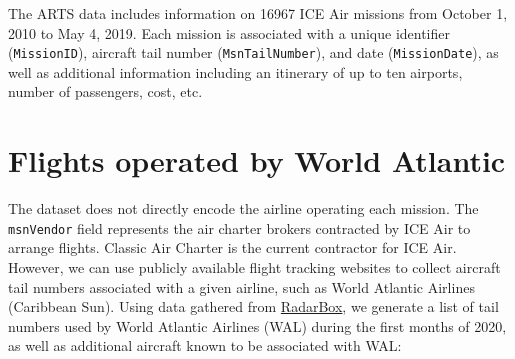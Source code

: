 \documentclass[a4paper,11pt,final]{article}
\begin{document}
The ARTS data includes information on 16967 ICE Air missions from
October 1, 2010 to May 4, 2019. Each mission is associated with a unique
identifier (\texttt{MissionID}), aircraft tail number
(\texttt{MsnTailNumber}), and date (\texttt{MissionDate}), as well as
additional information including an itinerary of up to ten airports,
number of passengers, cost, etc.

\section{Flights operated by World Atlantic}

The dataset does not directly encode the airline operating each mission.
The \texttt{msnVendor} field represents the air charter brokers
contracted by ICE Air to arrange flights. Classic Air Charter is the
current contractor for ICE Air. However, we can use publicly available
flight tracking websites to collect aircraft tail numbers associated
with a given airline, such as World Atlantic Airlines (Caribbean Sun).
Using data gathered from \href{https://www.radarbox.com/}{RadarBox}, we
generate a list of tail numbers used by World Atlantic Airlines (WAL)
during the first months of 2020, as well as additional aircraft known to
be associated with WAL:
\end{document}
